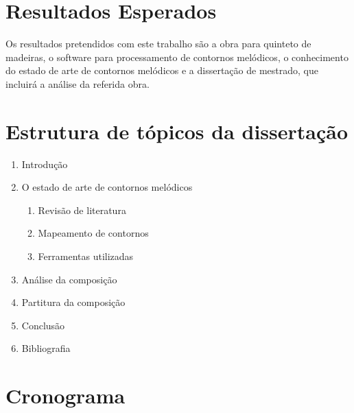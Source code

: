 \documentclass{article}
\begin{document}
\section{Resultados Esperados}
\label{sec:resultados-esperados}

Os resultados pretendidos com este trabalho são a obra para quinteto
de madeiras, o software para processamento de contornos melódicos, o
conhecimento do estado de arte de contornos melódicos e a dissertação
de mestrado, que incluirá a análise da referida obra.

\section{Estrutura de tópicos da dissertação}
\label{sec:estrutura-de-topicos}

\begin{enumerate}
\item Introdução
\item O estado de arte de contornos melódicos
  \begin{enumerate}
  \item Revisão de literatura
  \item Mapeamento de contornos
  \item Ferramentas utilizadas
  \end{enumerate}
\item Análise da composição
\item Partitura da composição
\item Conclusão
\item Bibliografia
\end{enumerate}

\section{Cronograma}
\label{sec:cronograma}
\end{document}

